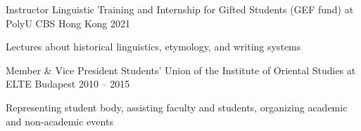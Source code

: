 
\begin{cventries}

  \cventry
    {Instructor} %
    {Linguistic Training and Internship for Gifted Students (GEF fund) at PolyU CBS} %
    {Hong Kong} %
    {2021} %
    {
      \begin{cvitems} %
        \item {Lectures about historical linguistics, etymology, and writing systems}
      \end{cvitems}
    }

  \cventry
    {Member \& Vice President} %
    {Students’ Union of the Institute of Oriental Studies at ELTE} %
    {Budapest} %
    {2010 -- 2015} %
    {
      \begin{cvitems} %
        \item {Representing student body, assisting faculty and students, organizing academic and non-academic events}
      \end{cvitems}
    }
  

\end{cventries}
